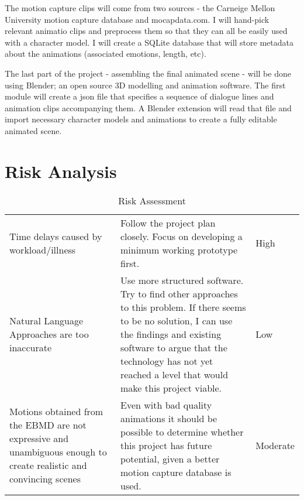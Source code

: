 The motion capture clips will come from two sources - the Carneige Mellon University motion capture database and mocapdata.com. I will hand-pick relevant animatio clips and preprocess them so that they can all be easily used with a character model. I will create a SQLite database that will store metadata about the animations (associated emotions, length, etc).

The last part of the project - assembling the final animated scene - will be done using Blender; an open source 3D modelling and animation software. The first module will create a json file that specifies a sequence of dialogue lines and animation clips accompanying them. A Blender extension will read that file and import necessary character models and animations to create a fully editable animated scene.

\section{Risk Analysis}

\begin{table}[!ht]
	\centering
	\small
	
	\begin{tabular}{ |p{11em} |p{23.8em}|p{4em}| }
	 \hline
		\thead{Risk} & \thead{Mitigation} & \thead{Level} \\
	 \hline
	 	Time delays caused by workload/illness & Follow the project plan closely. Focus on developing a minimum working prototype first. & High \\
	 \hline
		Natural Language Approaches are too inaccurate & Use more structured software. Try to find other approaches to this problem. If there seems to be no solution, I can use the findings and existing software to argue that the technology has not yet reached a level that would make this project viable.  &  Low \\
	\hline
		Motions obtained from the EBMD are not expressive and unambiguous enough to create realistic and convincing scenes & Even with bad quality animations it should be possible to determine whether this project has future potential, given a better motion capture database is used. & Moderate \\
	\hline
	\end{tabular}

	 \caption{Risk Assessment}
	 \label{tab:riskassessment}
	 
\end{table}